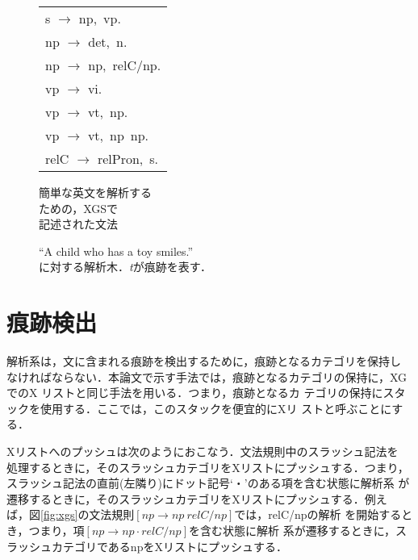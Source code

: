 \begin{figure}[htbp]
  \begin{minipage}[b]{4cm}
    \begin{center}
      \begin{tabular}[h]{l}
        s $\to$ np,\ vp.\\
        np $\to$ det,\ n.\\
        np $\to$ np,\ relC/np.\\
        vp $\to$ vi.\\
        vp $\to$ vt,\ np.\\
        vp $\to$ vt,\ np\ np.\\
        relC $\to$ relPron,\ s.
      \end{tabular}
      \caption{簡単な英文を解析する\\ための，XGSで\\記述された文法}
      \label{fig:xgs}
    \end{center}
  \end{minipage}
  \begin{minipage}[b]{10cm}
    \begin{center}
      
      \caption{``A child who has a toy smiles.''\\に対する解析木．{\it t}が痕跡を表す．}
      \label{fig:tree}
    \end{center}
  \end{minipage}
\end{figure}

\section{痕跡検出}

解析系は，文に含まれる痕跡を検出するために，痕跡となるカテゴリを保持し
なければならない．本論文で示す手法では，痕跡となるカテゴリの保持に，XG
でのX リスト\cite{Pereira1981}と同じ手法を用いる．つまり，痕跡となるカ
テゴリの保持にスタックを使用する．ここでは，このスタックを便宜的にXリ
ストと呼ぶことにする．

Xリストへのプッシュは次のようにおこなう．文法規則中のスラッシュ記法を
処理するときに，そのスラッシュカテゴリをXリストにプッシュする．つまり，
スラッシュ記法の直前(左隣り)にドット記号`・'のある項を含む状態に解析系
が遷移するときに，そのスラッシュカテゴリをXリストにプッシュする．例え
ば，図\ref{fig:xgs}の文法規則$[np \to np\ relC/np]$では，relC/npの解析
を開始するとき，つまり，項$[np \to np \cdot relC/np]$を含む状態に解析
系が遷移するときに，スラッシュカテゴリであるnpをXリストにプッシュする．


